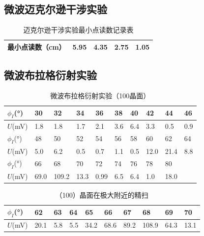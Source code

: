 \documentclass[zihao=5, UTF8]{article}
\theoremstyle{MyLineTheoremStyle} %
\theoremstyle{MyBlockTheoremStyle} %
\theoremstyle{MySubsubsectionStyle} %
\begin{document}
\subsection{微波迈克尔逊干涉实验}
\begin{table}[H]
    \centering
    \begin{tabularx}{\textwidth}{|X|*{4}{X|}} %
        \hline
        最小点读数（cm） & 5.95 & 4.35 & 2.75 & 1.05 \\ %
        \hline
    \end{tabularx}
    \caption{迈克尔逊干涉实验最小点读数记录表} %
    \label{迈克尔逊干涉实验最小点读数记录表} %
\end{table}

\subsection{微波布拉格衍射实验}
\begin{table}[H]
    \centering
    \begin{tabularx}{\textwidth}{|X|*{9}{X|}} %
        \hline
        \(\phi_I\)(°) & 30 & 32 & 34 & 36 & 38 & 40 & 42 & 44 & 46 \\ %
        \hline
        \(U\)(mV) & 1.8 & 1.8 & 1.7 & 2.1 & 3.6 & 6.4 & 3.3 & 0.5 & 0.9 \\ %
        \hline
        \(\phi_I\)(°) & 48 & 50 & 52 & 54 & 56 & 58 & 60 & 62 & 64 \\ %
        \hline
        \(U\)(mV) & 5.0 & 6.2 & 0.5 & 0.7 & 1.1 & 0.5 & 12.0 & 21.4 & 8.8 \\ %
        \hline
        \(\phi_I\)(°) & 66 & 68 & 70 & 72 & 74 & 76 & 78 & 80 & \\ %
        \hline
        \(U\)(mV) & 69.0 & 109.2 & 13.3 & 0.99 & 6.5 & 6.4 & 1.0 & 18.0 & \\ %
        \hline
    \end{tabularx}
    \caption{微波布拉格衍射实验（100晶面）} %
    \label{微波布拉格衍射实验（100晶面）表} %
\end{table}

\begin{table}[H]
    \centering
    \begin{tabularx}{\textwidth}{|X|*{9}{X|}} %
        \hline
        \(\phi_I\)(°) & 62 & 63 & 64 & 65 & 66 & 67 & 68 & 69 & 70 \\ %
        \hline
        \(U\)(mV) & 20.1 & 5.8 & 5.5 & 34.2 & 68.6 & 89.2 & 108.9 & 64.3 & 13.1 \\ %
        \hline
    \end{tabularx}
    \caption{（100）晶面在极大附近的精扫} %
    \label{（100）晶面在极大附近的精扫表} %
\end{table}
\end{document}
